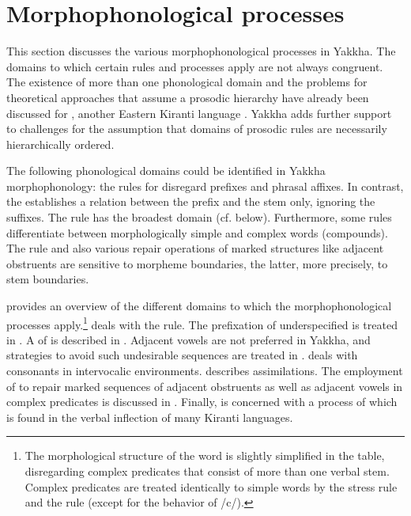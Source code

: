 \section{Morphophonological processes}\label{morphophon}



This section discusses the various morphophonological processes in Yakkha. The domains to which certain rules and processes apply are not always congruent. The existence of more than one phonological domain and the problems for theoretical approaches that assume a prosodic hierarchy have already been discussed for , another Eastern \mbox{Kiranti} language  \citep{Hildebrandt2007Prosodic, Schieringetal2010The-prosodic}. Yakkha adds further support to challenges for the assumption that domains of prosodic rules are necessarily hierarchically ordered. 

The following phonological domains could be identified in Yakkha morpho\-pho\-no\-logy: the rules for  disregard prefixes and phrasal affixes. In contrast, the  establishes a relation between the prefix and the stem only, ignoring the suffixes. The  rule has the broadest domain (cf.  below). Furthermore, some rules differentiate between morphologically simple and complex words (compounds). The  rule and also various repair operations of marked structures like adjacent obstruents are sensitive to morpheme boundaries, the latter, more precisely,  to stem boundaries. 

 provides an overview of the different domains to which the morphophonological processes apply.\footnote{The morphological structure of the word is slightly simplified in the table, disregarding complex predicates that consist of more than one verbal stem. Complex predicates are treated identically to simple words by the stress rule and the  rule (except for the behavior of /c/).}  deals with  the  rule. The prefixation of underspecified  is treated in . A  of  is described in . Adjacent vowels are not preferred in Yakkha, and strategies to avoid such undesirable sequences are treated in .  deals with consonants in intervocalic environments.  describes assimilations. The employment of  to repair marked sequences of adjacent obstruents as well as adjacent vowels in complex predicates is discussed in . Finally,  is concerned with a process of  which is found in the verbal inflection of many Kiranti languages.


